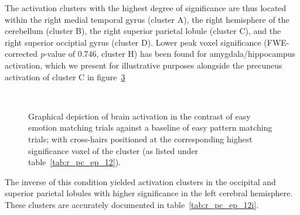 		The activation clusters with the highest degree of significance are thus located within the right medial temporal gyrus (cluster A), the right hemisphere of the cerebellum (cluster B), the right superior parietal lobule (cluster C), and the right superior occiptial gyrus (cluster D).
		Lower peak voxel significance (FWE-corrected \textit{p}-value of 0.746, cluster H) has been found for amygdala/hippocampus activation, which we present for illustrative purposes alongside the precuneus activation of cluster C in figure~\ref{fig:r_pc_ep_12}
		\begin{figure}[H]
		    \begin{subfigure}[H]{0.495\textwidth}
			\centering{}
			\label{fig:r_pc_ep_12_pc}
		    \end{subfigure}
		    ~%
		    \begin{subfigure}[H]{0.495\textwidth}
			\centering{}
			\label{fig:r_pc_ep_12_am}
		    \end{subfigure}
		    \caption{Graphical depiction of brain activation in the contrast of easy emotion matching trials against a baseline of easy pattern matching trials; with cross-hairs positioned at the corresponding highest significance voxel of the cluster (as listed under table~\ref{tab:r_pc_ep_12}).}
		    \label{fig:r_pc_ep_12}
		\end{figure}
		
		The inverse of this condition yielded activation clusters in the occipital and superior parietal lobules with higher significance in the left cerebral hemisphere.
		These clusters are accurately documented in table~\ref{tab:r_pc_ep_12i}.
